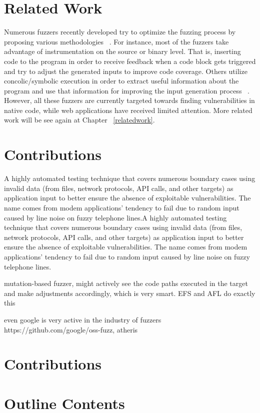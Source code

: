 \section{Related Work}
 Numerous fuzzers recently developed try to optimize the fuzzing process by proposing various methodologies ~\cite{godefroid2012sage, stephens2016driller, rawat2017vuzzer, aschermann2019nautilus, aschermann2019redqueen, hoffman2020Was, osterlund2020parmesan }. For instance, most of the fuzzers take advantage of instrumentation on the source or binary level. That is, inserting code to the program in order to receive feedback when a code block gets
triggered and try to adjust the generated inputs to improve code coverage. Others utilize concolic/symbolic execution in order to extract useful information about the program and use that information for improving the input generation process ~\cite{stephens2016driller,godefroid2005dart,godefroid2012sage}. However, all these fuzzers are currently targeted towards finding vulnerabilities in native code, while web applications have received limited attention. More related work will be see again at Chapter ~\ref{relatedwork}.


\section{Contributions}
A highly automated testing technique that covers numerous boundary cases
using invalid data (from files, network protocols, API calls, and other targets)
as application input to better ensure the absence of exploitable vulnerabilities.
The name comes from modem applications’ tendency to fail due
to random input caused by line noise on fuzzy telephone lines.A highly automated testing technique that covers numerous boundary cases
using invalid data (from files, network protocols, API calls, and other targets)
as application input to better ensure the absence of exploitable vulnerabilities.
The name comes from modem applications’ tendency to fail due
to random input caused by line noise on fuzzy telephone lines.



mutation-based fuzzer, might actively see the code paths executed in the target and make adjustments accordingly, which is very smart. EFS and AFL do exactly this

even google is very active in the industry of fuzzers https://github.com/google/oss-fuzz, atheris


\section{Contributions}

\section{Outline Contents}